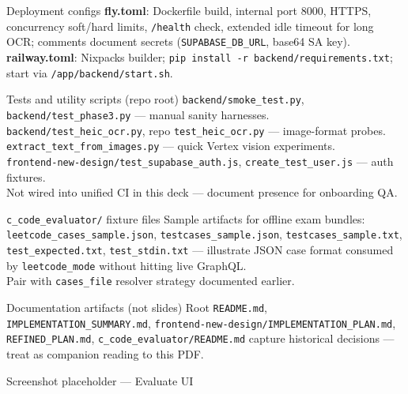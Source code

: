 \documentclass[aspectratio=169]{beamer}
\begin{document}
\begin{frame}{Deployment configs}
  \small
  \textbf{fly.toml}: Dockerfile build, internal port 8000, HTTPS, concurrency soft/hard limits, \texttt{/health} check, extended idle timeout for long OCR; comments document secrets (\texttt{SUPABASE\_DB\_URL}, base64 SA key).\\
  \textbf{railway.toml}: Nixpacks builder; \texttt{pip install -r backend/requirements.txt}; start via \texttt{/app/backend/start.sh}.
\end{frame}

\begin{frame}{Tests and utility scripts (repo root)}
  \tiny
  \texttt{backend/smoke\_test.py}, \texttt{backend/test\_phase3.py} --- manual sanity harnesses.\\
  \texttt{backend/test\_heic\_ocr.py}, repo \texttt{test\_heic\_ocr.py} --- image-format probes.\\
  \texttt{extract\_text\_from\_images.py} --- quick Vertex vision experiments.\\
  \texttt{frontend-new-design/test\_supabase\_auth.js}, \texttt{create\_test\_user.js} --- auth fixtures.\\
  Not wired into unified CI in this deck --- document presence for onboarding QA.
\end{frame}

\begin{frame}{\texttt{c\_code\_evaluator/} fixture files}
  \small
  Sample artifacts for offline exam bundles:\\
  \texttt{leetcode\_cases\_sample.json}, \texttt{testcases\_sample.json}, \texttt{testcases\_sample.txt}, \texttt{test\_expected.txt}, \texttt{test\_stdin.txt} --- illustrate JSON case format consumed by \texttt{leetcode\_mode} without hitting live GraphQL.\\
  Pair with \texttt{cases\_file} resolver strategy documented earlier.
\end{frame}

\begin{frame}{Documentation artifacts (not slides)}
  \small
  Root \texttt{README.md}, \texttt{IMPLEMENTATION\_SUMMARY.md}, \texttt{frontend-new-design/IMPLEMENTATION\_PLAN.md}, \texttt{REFINED\_PLAN.md}, \texttt{c\_code\_evaluator/README.md} capture historical decisions --- treat as companion reading to this PDF.
\end{frame}


\begin{frame}{Screenshot placeholder --- Evaluate UI}
  \begin{center}
  \end{center}
\end{frame}
\end{document}
